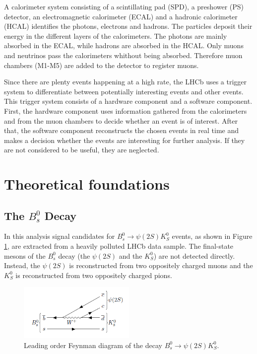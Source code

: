 A calorimeter system consisting of a scintillating pad (SPD), a preshower (PS) detector, an electromagnetic calorimeter (ECAL) and a hadronic calorimeter (HCAL) identifies the photons, electrons and hadrons. The particles deposit their energy in the different layers of the calorimeters. The photons are mainly absorbed in the ECAL, while hadrons are absorbed in the HCAL.
Only muons and neutrinos pass the calorimeters whithout being absorbed. Therefore muon chambers (M1-M5) are added to the detector to register muons.

Since there are plenty events happening at a high rate, the LHCb uses a trigger system to differentiate between potentially interesting events and other events. This trigger system consists of a hardware component and a software component. First, the hardware component uses information gathered from the calorimeters and from the muon chambers to decide whether an event is of interest. After that, the software component reconstructs the chosen events in real time and makes a decision whether the events are interesting for further analysis. If they are not considered to be useful, they are neglected.

\section{Theoretical foundations}
\label{sec:Theorie}

\subsection{The $B^0_s$ Decay}

In this analysis signal candidates for $B^0_s \rightarrow \psi(2S)K^0_S$ events, as shown in Figure \ref{fig:decay}, are extracted from a heavily polluted LHCb data sample.
The final-state mesons of the $B^0_s$ decay (the $\psi(2S)$ and the $K^0_S$) are not detected directly. Instead, the $\psi(2S)$ is reconstructed from two oppositely charged muons and the $K^0_S$ is reconstructed from two oppositely charged pions.

\begin{figure}[!htb]
  \centering
  \includegraphics[width=0.5\textwidth]{graphics/decay.png}
  \caption{Leading order Feynman diagram of the decay $B^0_s \rightarrow \psi(2S)K^0_S$.}
  \label{fig:decay}
\end{figure}

